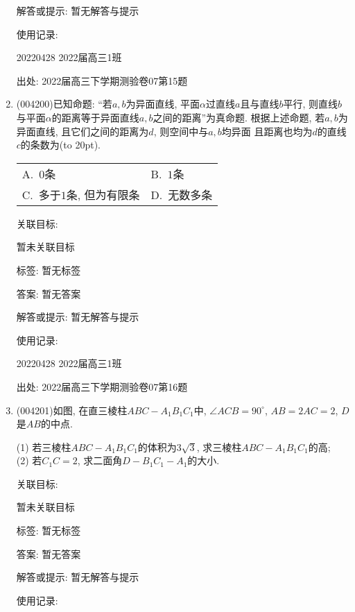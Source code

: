 \documentclass[10pt,a4paper]{article}
\newcommand{\bracket}[1]{(\hbox to #1pt{})}
\newcommand{\twoch}[4]{\par\begin{tabular}{p{.46\textwidth}p{.46\textwidth}}
A.~#1& B.~#2\\
C.~#3& D.~#4
\end{tabular}}
\begin{document}
\begin{enumerate}[1.]
解答或提示: 暂无解答与提示

使用记录:

20220428	2022届高三1班	


出处: 2022届高三下学期测验卷07第15题
\item { (004200)}已知命题: ``若$a,b$为异面直线, 平面$\alpha$过直线$a$且与直线$b$平行, 则直线$b$与平面$\alpha$的距离等于异面直线$a,b$之间的距离''为真命题.
根据上述命题, 若$a,b$为异面直线, 且它们之间的距离为$d$, 则空间中与$a,b$均异面
且距离也均为$d$的直线$c$的条数为\bracket{20}.
\twoch{$0$条}{$1$条}{多于$1$条, 但为有限条}{无数多条}


关联目标:

暂未关联目标



标签: 暂无标签

答案: 暂无答案

解答或提示: 暂无解答与提示

使用记录:

20220428	2022届高三1班	


出处: 2022届高三下学期测验卷07第16题
\item { (004201)}如图, 在直三棱柱$ABC-A_1B_1C_1$中, $\angle ACB=90^\circ$,
$AB=2AC=2$, $D$是$AB$的中点.
\begin{center}
\end{center}
(1) 若三棱柱$ABC-A_1B_1C_1$的体积为$3\sqrt 3$, 求三棱柱$ABC-A_1B_1C_1$的高;\\
(2) 若$C_1C=2$, 求二面角$D-B_1C_1-A_1$的大小.


关联目标:

暂未关联目标



标签: 暂无标签

答案: 暂无答案

解答或提示: 暂无解答与提示

使用记录:


\end{enumerate}
\end{document}
